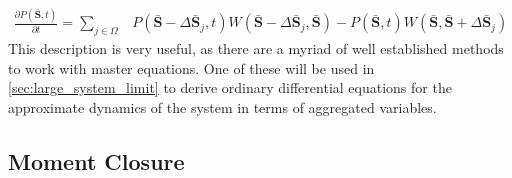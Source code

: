 \begin{align}
	\frac{{\partial} P(\mathbf{\bar{S}}, t)}{\partial t} = \sum_{j \in \Omega} &P(\mathbf{\bar{S}} - \Delta \mathbf{\bar{S}}_j, t) W(\mathbf{\bar{S}} - \Delta \mathbf{\bar{S}}_j,\mathbf{\bar{S}})- P(\mathbf{\bar{S}}, t) W(\mathbf{\bar{S}},\mathbf{\bar{S}} + \Delta \mathbf{\bar{S}}_j) \label{eq:PBP}
\end{align}
This description is very useful, as there are a myriad of well established methods to work with master equations. One of these will be used in \cref{sec:large_system_limit} to derive ordinary differential equations for the approximate dynamics of the system in terms of aggregated variables.
\subsection{Moment Closure}
\label{moment_closure}

